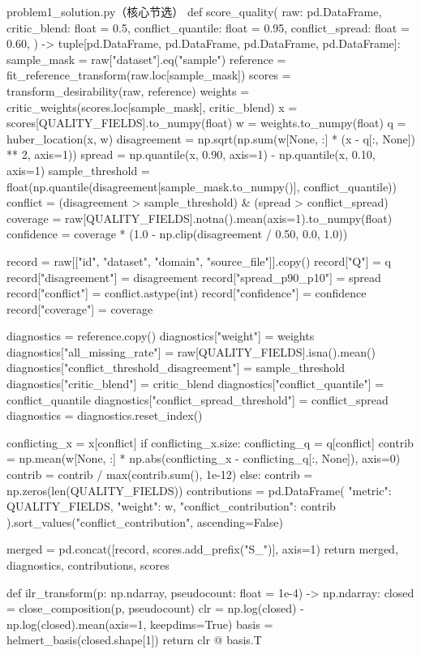 \documentclass[bwprint]{gmcmthesis}
\numberwithin{equation}{section}
\numberwithin{figure}{section}
\numberwithin{table}{section}
\begin{document}
\begin{appendices}
\begin{Python}{problem1\_solution.py（核心节选）}
def score_quality(
    raw: pd.DataFrame,
    critic_blend: float = 0.5,
    conflict_quantile: float = 0.95,
    conflict_spread: float = 0.60,
) -> tuple[pd.DataFrame, pd.DataFrame, pd.DataFrame, pd.DataFrame]:
    sample_mask = raw["dataset"].eq("sample")
    reference = fit_reference_transform(raw.loc[sample_mask])
    scores = transform_desirability(raw, reference)
    weights = critic_weights(scores.loc[sample_mask], critic_blend)
    x = scores[QUALITY_FIELDS].to_numpy(float)
    w = weights.to_numpy(float)
    q = huber_location(x, w)
    disagreement = np.sqrt(np.sum(w[None, :] * (x - q[:, None]) ** 2, axis=1))
    spread = np.quantile(x, 0.90, axis=1) - np.quantile(x, 0.10, axis=1)
    sample_threshold = float(np.quantile(disagreement[sample_mask.to_numpy()], conflict_quantile))
    conflict = (disagreement > sample_threshold) & (spread > conflict_spread)
    coverage = raw[QUALITY_FIELDS].notna().mean(axis=1).to_numpy(float)
    confidence = coverage * (1.0 - np.clip(disagreement / 0.50, 0.0, 1.0))

    record = raw[["id", "dataset", "domain", "source_file"]].copy()
    record["Q"] = q
    record["disagreement"] = disagreement
    record["spread_p90_p10"] = spread
    record["conflict"] = conflict.astype(int)
    record["confidence"] = confidence
    record["coverage"] = coverage

    diagnostics = reference.copy()
    diagnostics["weight"] = weights
    diagnostics["all_missing_rate"] = raw[QUALITY_FIELDS].isna().mean()
    diagnostics["conflict_threshold_disagreement"] = sample_threshold
    diagnostics["critic_blend"] = critic_blend
    diagnostics["conflict_quantile"] = conflict_quantile
    diagnostics["conflict_spread_threshold"] = conflict_spread
    diagnostics = diagnostics.reset_index()

    conflicting_x = x[conflict]
    if conflicting_x.size:
        conflicting_q = q[conflict]
        contrib = np.mean(w[None, :] * np.abs(conflicting_x - conflicting_q[:, None]), axis=0)
        contrib = contrib / max(contrib.sum(), 1e-12)
    else:
        contrib = np.zeros(len(QUALITY_FIELDS))
    contributions = pd.DataFrame(
        {"metric": QUALITY_FIELDS, "weight": w, "conflict_contribution": contrib}
    ).sort_values("conflict_contribution", ascending=False)

    merged = pd.concat([record, scores.add_prefix("S_")], axis=1)
    return merged, diagnostics, contributions, scores


def ilr_transform(p: np.ndarray, pseudocount: float = 1e-4) -> np.ndarray:
    closed = close_composition(p, pseudocount)
    clr = np.log(closed) - np.log(closed).mean(axis=1, keepdims=True)
    basis = helmert_basis(closed.shape[1])
    return clr @ basis.T



\end{Python}
\end{appendices}
\end{document}
